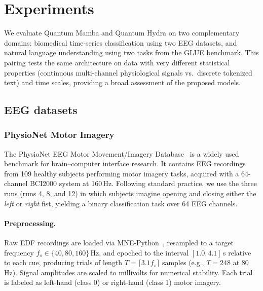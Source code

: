 
\section{Experiments}
\label{sec:experiments}

We evaluate Quantum Mamba and Quantum Hydra on two complementary domains: biomedical time-series classification using two EEG datasets, and natural language understanding using two tasks from the GLUE benchmark.
This pairing tests the same architecture on data with very different statistical properties (continuous multi-channel physiological signals vs.\ discrete tokenized text) and time scales, providing a broad assessment of the proposed models.

\subsection{EEG datasets}
\label{sec:eeg_datasets}

\subsubsection{PhysioNet Motor Imagery}
\label{sec:physionet}

The PhysioNet EEG Motor Movement/Imagery Database~\cite{schalk2004bci2000,goldberger2000physiobank} is a widely used benchmark for brain--computer interface research. It contains EEG recordings from 109 healthy subjects performing motor imagery tasks, acquired with a 64-channel BCI2000 system at 160\,Hz.
Following standard practice, we use the three runs (runs 4, 8, and 12) in which subjects imagine opening and closing either the \emph{left} or \emph{right} fist, yielding a binary classification task over 64 EEG channels.

\paragraph{Preprocessing.}
Raw EDF recordings are loaded via MNE-Python~\cite{gramfort2013meg}, resampled to a target frequency $f_s \in \{40, 80, 160\}$\,Hz, and epoched to the interval $[1.0, 4.1]$\,s relative to each cue, producing trials of length $T = \lceil 3.1 f_s \rceil$ samples (e.g., $T = 248$ at 80\,Hz).
Signal amplitudes are scaled to millivolts for numerical stability.
Each trial is labeled as left-hand (class 0) or right-hand (class 1) motor imagery.

